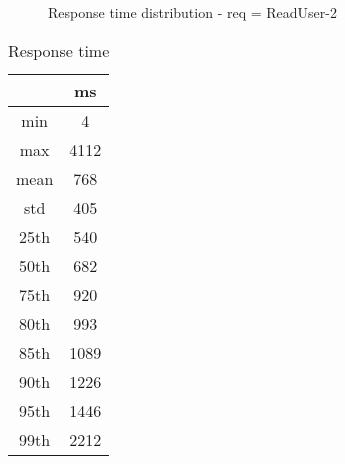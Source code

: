 \begin{minipage}{0.75\linewidth}
\begin{figure}[h]
\begin{adjustbox}{max width=1.0\linewidth, keepaspectratio}
  \end{adjustbox}
  \caption{Response time distribution - req = ReadUser-2}
\end{figure}
\end{minipage}\hfill\begin{minipage}{0.18\linewidth}
\begin{table}[h]
\begin{tabular}{|cc|}
\hline
\textbf{} & \textbf{ms}\\ \hline
 \Xhline{0.005\arrayrulewidth}
min & 4\\
 \Xhline{0.005\arrayrulewidth}
max & 4112\\
 \Xhline{0.005\arrayrulewidth}
mean & 768\\
 \Xhline{0.005\arrayrulewidth}
std & 405\\
\hline
\hline
 \Xhline{0.005\arrayrulewidth}
25th & 540\\
 \Xhline{0.005\arrayrulewidth}
50th & 682\\
 \Xhline{0.005\arrayrulewidth}
75th & 920\\
 \Xhline{0.005\arrayrulewidth}
80th & 993\\
 \Xhline{0.005\arrayrulewidth}
85th & 1089\\
 \Xhline{0.005\arrayrulewidth}
90th & 1226\\
 \Xhline{0.005\arrayrulewidth}
95th & 1446\\
 \Xhline{0.005\arrayrulewidth}
99th & 2212\\
\hline
\end{tabular}
\caption{Response time}
\end{table}
\end{minipage}\hfill